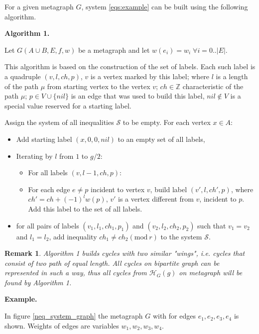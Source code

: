 \documentclass[leqno]{aadmbook}
\newtheorem{notice}{Remark}
\renewcommand{\mod}[1]{\textrm{mod}\ #1}
\begin{document}

For a given metagraph $G$, system \eqref{eqs:example} can be built using the following algorithm.

\textbf{Algorithm 1.}

Let $G(A \cup B, E, f, w)$ be a metagraph and let $w(e_i) = w_i \; \forall i = 0..|E|$.

This algorithm is based on the construction of the set of labels.
Each such label is a quadruple $(v, l, ch, p)$,
$v$ is a vertex marked by this label;
where $l$ is a length of the path $\mu$ from starting vertex to the vertex $v$; 
$ch \in \mathbb{Z}$ characteristic of the path $\mu$;
$p \in V \cup \{ nil \}$ is an edge that was used to build this label, $nil \not\in V $ is a special value reserved for a starting label.

Assign the system of all inequalities $\mathcal{S}$ to be empty.
For each vertex $x \in A$:

\begin{itemize}
    \item Add starting label $(x, 0, 0, nil)$ to an empty set of all labels,
    \item Iterating by $l$ from $1$ to $g / 2$:
    \begin{itemize}
        \item For all labels $(v, l - 1, ch, p)$:
        \item
            For each edge $e \not= p$ incident to vertex $v$,
            build label $(v', l, ch', p)$, where $ch' = ch + (-1)^{l} w(p)$, $v'$ is a vertex different from $v$, incident to $p$.
            Add this label to the set of all labels.
    \end{itemize}
    \item for all pairs of labels $(v_1, l_1, ch_1, p_1)$ and $(v_2, l_2, ch_2, p_2)$ such that $v_1 = v_2$ and $l_1 = l_2$, add inequality $ch_1 \neq ch_2 (\mod{r})$ to the system $\mathcal{S}$.
\end{itemize}

\begin{notice}
    Algorithm 1 builds cycles with two similar "wings", i.e. cycles that consist of two path of equal length. All cycles on bipartite graph can be represented in such a way, thus all cycles from $\mathcal{H}_G(g)$ on metagraph will be found by Algorithm 1.
\end{notice}

\textbf{Example.}

In figure \ref{neq_system_graph} the metagraph $G$ with for edges $e_1, e_2, e_3, e_4$ is shown. Weights of edges are variables $w_1, w_2, w_3, w_4$.
\end{document}
